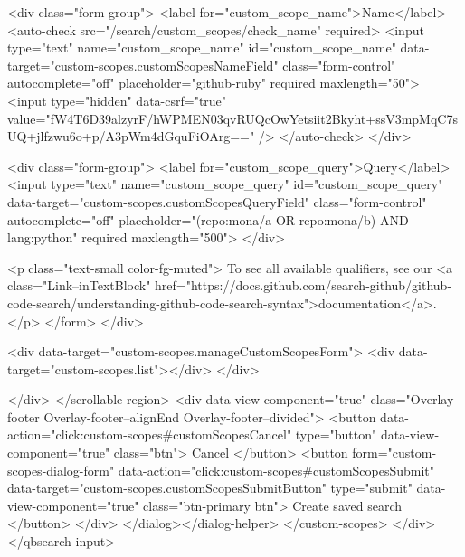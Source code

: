           <div class="form-group">
            <label for="custom_scope_name">Name</label>
            <auto-check src="/search/custom_scopes/check_name" required>
              <input
                type="text"
                name="custom_scope_name"
                id="custom_scope_name"
                data-target="custom-scopes.customScopesNameField"
                class="form-control"
                autocomplete="off"
                placeholder="github-ruby"
                required
                maxlength="50">
              <input type="hidden" data-csrf="true" value="fW4T6D39alzyrF/hWPMEN03qvRUQcOwYetsiit2Bkyht+ssV3mpMqC7sUQ+jlfzwu6o+p/A3pWm4dGquFiOArg==" />
            </auto-check>
          </div>

          <div class="form-group">
            <label for="custom_scope_query">Query</label>
            <input
              type="text"
              name="custom_scope_query"
              id="custom_scope_query"
              data-target="custom-scopes.customScopesQueryField"
              class="form-control"
              autocomplete="off"
              placeholder="(repo:mona/a OR repo:mona/b) AND lang:python"
              required
              maxlength="500">
          </div>

          <p class="text-small color-fg-muted">
            To see all available qualifiers, see our <a class="Link--inTextBlock" href="https://docs.github.com/search-github/github-code-search/understanding-github-code-search-syntax">documentation</a>.
          </p>
</form>        </div>

        <div data-target="custom-scopes.manageCustomScopesForm">
          <div data-target="custom-scopes.list"></div>
        </div>

</div>
      </scrollable-region>
      <div data-view-component="true" class="Overlay-footer Overlay-footer--alignEnd Overlay-footer--divided">          <button data-action="click:custom-scopes#customScopesCancel" type="button" data-view-component="true" class="btn">    Cancel
</button>
          <button form="custom-scopes-dialog-form" data-action="click:custom-scopes#customScopesSubmit" data-target="custom-scopes.customScopesSubmitButton" type="submit" data-view-component="true" class="btn-primary btn">    Create saved search
</button>
</div>
</dialog></dialog-helper>
    </custom-scopes>
  </div>
</qbsearch-input>


